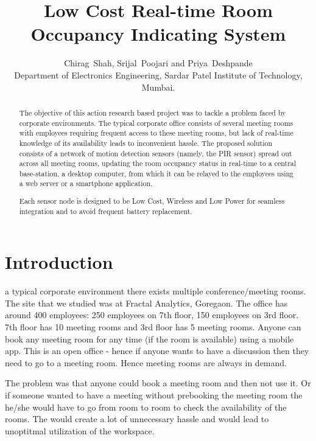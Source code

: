\documentclass[journal]{IEEEtran}
\begin{document}
\title{Low Cost Real-time Room Occupancy Indicating System}
\author{Chirag~Shah, Srijal~Poojari and Priya~Deshpande
\\
Department of Electronics Engineering, Sardar Patel Institute of Technology, Mumbai.}



\maketitle
\begin{abstract}
The objective of this action research based project was to tackle a problem faced by corporate environments. The typical corporate office consists of several meeting rooms with employees requiring frequent access to these meeting rooms, but lack of real-time knowledge of its availability leads to inconvenient hassle. The proposed solution consists of a network of motion detection sensors (namely, the PIR sensor) spread out across all meeting rooms, updating the room occupancy status in real-time to a central base-station, a desktop computer, from which it can be relayed to the employees using a web server or a smartphone application.

Each sensor node is designed to be Low Cost, Wireless and Low Power for seamless integration and to avoid frequent battery replacement.
\end{abstract}


\section{Introduction}
 a typical corporate environment there exists multiple conference/meeting rooms.
The site that we studied was at Fractal Analytics, Goregaon. The office has around 400 employees: 250 employees on 7th floor, 150 employees on 3rd floor. 7th floor has 10 meeting rooms and 3rd floor has 5 meeting rooms. Anyone can book any meeting room for any time (if the room is available) using a mobile app. This is an open office - hence if anyone wants to have a discussion then they need to go to a meeting room. Hence meeting rooms are always in demand.


The problem was that anyone could book a meeting room and then not use it. Or if someone wanted to have a meeting without prebooking the meeting room the he/she would have to go from room to room to check the availability of the rooms. The would create a lot of unnecessary hassle and would lead to unoptitmal utilization of the workspace.
\end{document}
